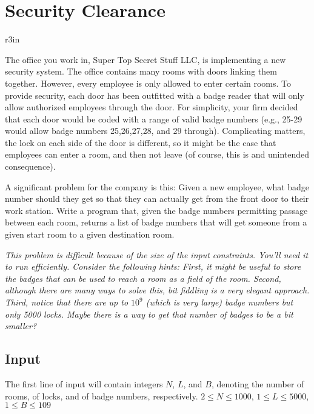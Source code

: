 \documentclass[11pt]{article}
\begin{document}
\section*{Security Clearance}


\begin{wrapfigure}{r}{3in}
\vspace{-10pt}
\vspace{-30pt}
\end{wrapfigure}

The office you work in, Super Top Secret Stuff LLC, is implementing a new security system. The office contains many rooms with doors linking them together. However, every employee is only allowed to enter certain rooms. To provide security, each door has been outfitted with a badge reader that will only allow authorized employees through the door. For simplicity, your firm decided that each door would be coded with a range of valid badge numbers (e.g., 25-29 would allow badge numbers 25,26,27,28, and 29 through). Complicating matters, the lock on each side of the door is different, so it might be the case that employees can enter a room, and then not leave (of course, this is and unintended consequence).

A significant problem for the company is this: Given a new employee, what badge number should they get so that they can actually get from the front door to their work station. Write a program that, given the badge numbers permitting passage between each room, returns a list of badge numbers that will get someone from a given start room to a given destination room.

\emph{This problem is difficult because of the size of the input constraints. You'll need it to run efficiently. Consider the following hints: First, it might be useful to store the badges that can be used to reach a room as a field of the room. Second, although there are many ways to solve this, bit fiddling is a very elegant approach. Third, notice that there are up to $10^9$ (which is very large) badge numbers but only 5000 locks. Maybe there is a way to get that number of badges to be a bit smaller?}

\subsection*{Input}
The first line of input will contain integers $N$, $L$, and $B$, denoting the number of rooms, of locks, and of badge numbers, respectively. $2 \leq N \leq 1000$, $1 \leq L \leq 5000$, $1 \leq B \leq 109$
\end{document}
